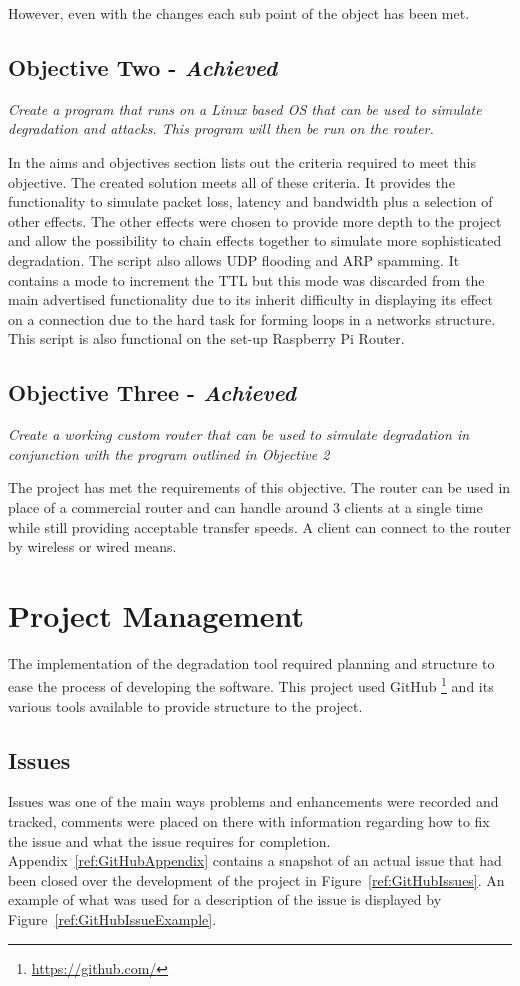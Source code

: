 However, even with the changes each sub point of the object has been met.

\subsection{Objective Two - {\it Achieved}}
{\it Create a program that runs on a Linux based OS that can be used to simulate degradation and attacks. This program will then be run on the router.}

In the aims and objectives section lists out the criteria required to meet this objective. The created solution meets all of these criteria. It provides the functionality to simulate packet loss, latency and bandwidth plus a selection of other effects. The other effects were chosen to provide more depth to the project and allow the possibility to chain effects together to simulate more sophisticated degradation. The script also allows UDP flooding and ARP spamming. It contains a mode to increment the TTL but this mode was discarded from the main advertised functionality due to its inherit difficulty in displaying its effect on a connection due to the hard task for forming loops in a networks structure. This script is also functional on the set-up Raspberry Pi Router.


\subsection{Objective Three - {\it Achieved}}
{\it Create a working custom router that can be used to simulate degradation in conjunction with the program outlined in Objective 2}

The project has met the requirements of this objective. The router can be used in place of a commercial router and can handle around 3 clients at a single time while still providing acceptable transfer speeds. A client can connect to the router by wireless or wired means.

\section{Project Management}
The implementation of the degradation tool required planning and structure to ease the process of developing the software. This project used GitHub \footnote{\url{https://github.com/}} and its various tools available to provide structure to the project.

\subsection{Issues}
Issues was one of the main ways problems and enhancements were recorded and tracked, comments were placed on there with information regarding how to fix the issue and what the issue requires for completion. Appendix~\ref{ref:GitHubAppendix} contains a snapshot of an actual issue that had been closed over the development of the project in Figure~\ref{ref:GitHubIssues}. An example of what was used for a description of the issue is displayed by Figure~\ref{ref:GitHubIssueExample}.

